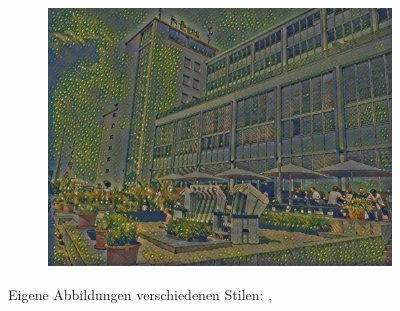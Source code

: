 \begin{frame}
\begin{figure}[H]
\begin{subfigure}[h]{0.32\textwidth}
            \includegraphics[width=\textwidth]{resources/content/experiments/htw-vgg16_portrait_of_joseph_roulin.jpg}
        \end{subfigure}
    
    
    
        \caption{Eigene Abbildungen verschiedenen Stilen: \cite{crystal_glass_on_a_colorful_background_img}, \cite{portrait_of_joseph_roulin_img}}
        \label{img:trained_models1}
    \end{figure} 

\end{frame}



